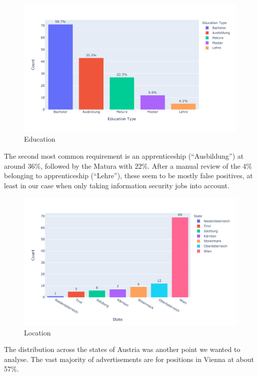 \documentclass[runningheads]{llncs}
\newcommand{\german}[1]{{#1}}
\begin{document}
\begin{figure}[H]
	\centering
  \includegraphics[width=\textwidth]{education-bar-chart.pdf}
	\caption{Education}
	\label{fig:education_chart}
\end{figure}

The second most common requirement is an apprenticeship (“\german{Ausbildung}”) at around 36\%, followed by the Matura with 22\%. After a manual review of the 4\% belonging to apprenticeship (“\german{Lehre}”), these seem to be mostly false positives, at least in our case when only taking information security jobs into account.

\begin{figure}[H]
	\centering
  \includegraphics[width=\textwidth]{location-bar-chart.pdf}
	\caption{Location}
	\label{fig:location_chart}
\end{figure}

The distribution across the states of Austria was another point we wanted to analyse. The vast majority of advertisements are for positions in Vienna at about 57\%.
\end{document}
